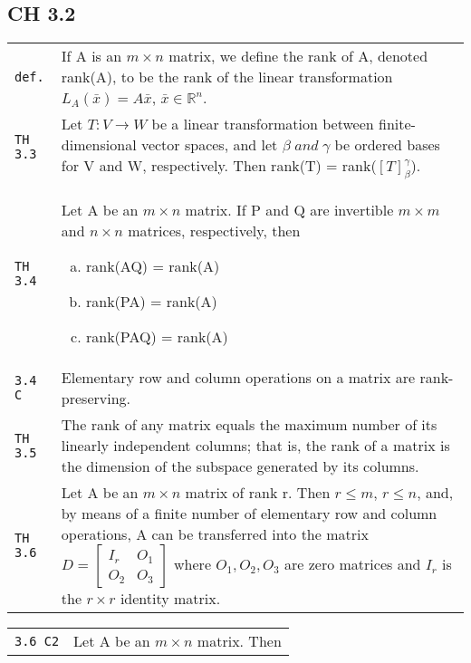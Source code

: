 \documentclass[10pt,landscape]{article}
\begin{document}
\begin{multicols}{3}
\section{CH 3.2}
\begin{tabular}{@{}p{\the\MyLen}%
                @{}p{\linewidth-\the\MyLen}@{}} %
\verb!def.! & If A is an $m\!\times\! n$ matrix, we define the rank of A, denoted rank(A), to be the rank of the linear transformation $L_A (\bar{x}) = A\bar{x}$, 
             $\bar{x}\in \mathbb{R}^n$.\\
\verb!TH 3.3! & Let $T: V\rightarrow W$ be a linear transformation between finite-dimensional vector spaces, and let $\beta\; and\;\gamma$ be ordered bases for V and W, respectively. Then
               rank(T) = rank($[T]_{\beta}^{\gamma}$).\\
\verb!TH 3.4! & Let A be an $m\!\times\! n$ matrix. If P and Q are invertible $m\!\times\! m$ and $n\!\times\! n$ matrices, respectively, then
               \begin{enumerate}[a)]
               \item rank(AQ) = rank(A)
               \item rank(PA) = rank(A)
               \item rank(PAQ) = rank(A)
               \end{enumerate}\\
\verb!3.4 C! & Elementary row and column operations on a matrix are rank-preserving.\\
\verb!TH 3.5! & The rank of any matrix equals the maximum number of its linearly independent columns; that is, the rank of a matrix is the dimension of the subspace generated by its
               columns.\\
\verb!TH 3.6! & Let A be an $m\!\times\! n$ matrix of rank r. Then $r\leq m$, $r\leq n$, and, by means of a finite number of elementary row and column operations, A can be transferred
               into the matrix $D = \begin{bmatrix} I_r & O_1 \\ O_2 & O_3\end{bmatrix}$ where $O_1, O_2, O_3$ are zero matrices and $I_r$ is the $r\!\times\! r$ identity matrix.\\
\end{tabular}
\begin{tabular}{@{}p{\the\MyLen}%
                @{}p{\linewidth-\the\MyLen}@{}} %
\verb!3.6 C2! & Let A be an $m\!\times\! n$ matrix. Then

\end{tabular}
\end{multicols}
\end{document}
